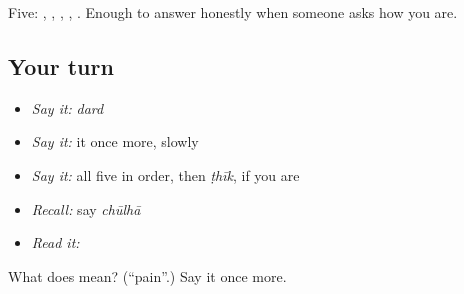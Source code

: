 \begin{grammarlens}[title={What you've built}]
Five: , , , , . Enough to answer honestly when someone asks how you are.
\end{grammarlens}

\subsection*{Your turn}
\begin{itemize}
\raggedright
  \item \emph{Say it:} \emph{dard}
  \item \emph{Say it:} it once more, slowly
  \item \emph{Say it:} all five in order, then \emph{ṭhīk}, if you are
  \item \emph{Recall:} say \emph{chūlhā}
  \item \emph{Read it:} \textbf{}
\end{itemize}

\begin{tcolorbox}[breakable,colback=teal!4,colframe=teal!35!black,title={Before you move on}]
What does  mean? (\textquotedblleft{}pain\textquotedblright{}.) Say it once more.
\end{tcolorbox}
